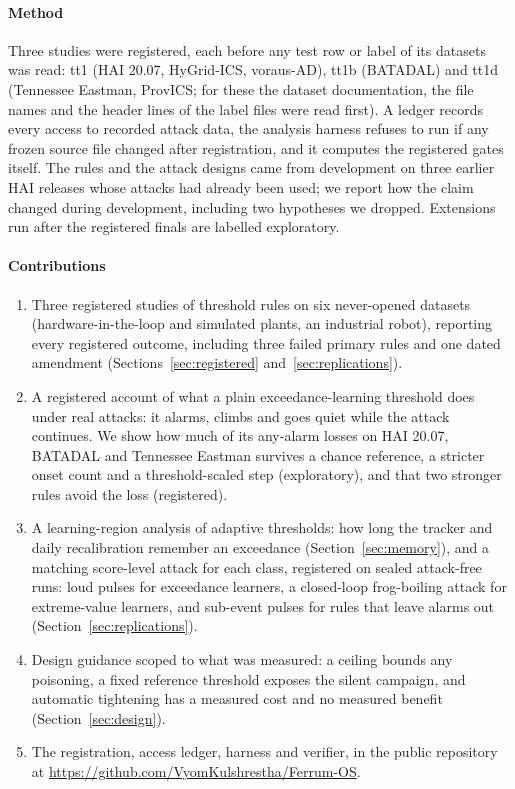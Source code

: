 \documentclass[sigconf]{acmart}
\begin{document}
\paragraph{Method}
Three studies were registered, each before any test row or label of its datasets was read: tt1 (HAI
20.07, HyGrid-ICS, voraus-AD), tt1b (BATADAL) and tt1d (Tennessee Eastman, ProvICS; for these the
dataset documentation, the file names and the header lines of the label files were read first). A ledger records every access to recorded attack data, the analysis harness refuses to
run if any frozen source file changed after registration, and it computes the registered gates
itself. The rules and the attack designs came from development on three earlier HAI releases whose
attacks had already been used; we report how the claim changed during development, including two
hypotheses we dropped. Extensions run after the registered finals are labelled exploratory.

\paragraph{Contributions}
\begin{enumerate}
\item Three registered studies of threshold rules on six never-opened datasets (hardware-in-the-loop
  and simulated plants, an industrial robot), reporting every registered outcome, including three
  failed primary rules and one dated amendment
  (Sections~\ref{sec:registered} and~\ref{sec:replications}).
\item A registered account of what a plain exceedance-learning threshold does under real attacks: it
  alarms, climbs and goes quiet while the attack continues. We show how much of its any-alarm losses
  on HAI 20.07, BATADAL and Tennessee Eastman survives a chance reference, a stricter onset count and a
  threshold-scaled step (exploratory), and that two stronger rules avoid the loss (registered).
\item A learning-region analysis of adaptive thresholds: how long the tracker and daily
  recalibration remember an exceedance (Section~\ref{sec:memory}), and a matching score-level attack
  for each class, registered on sealed attack-free runs: loud pulses for exceedance learners, a
  closed-loop frog-boiling attack for extreme-value learners, and sub-event pulses for rules that leave
  alarms out (Section~\ref{sec:replications}).
\item Design guidance scoped to what was measured: a ceiling bounds any poisoning, a fixed reference
  threshold exposes the silent campaign, and automatic tightening has a measured cost and no measured
  benefit (Section~\ref{sec:design}).
\item The registration, access ledger, harness and verifier, in the public repository at
  \url{https://github.com/VyomKulshrestha/Ferrum-OS}.
\end{enumerate}
\end{document}
